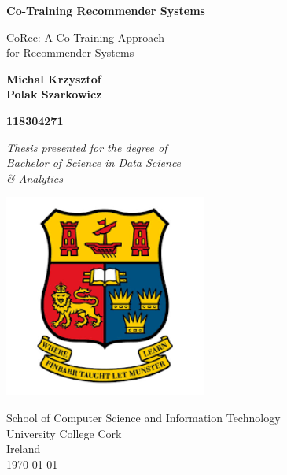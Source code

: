 \begin{titlepage}
    \begin{center}
        \vspace*{0.5cm}
        
        \Huge
        \textbf{Co-Training Recommender Systems}

        \vspace{0.5cm}
        
        \LARGE
        CoRec: A Co-Training Approach \\ for Recommender Systems
        
        \vspace{1cm}
        
        \textbf{Michal Krzysztof \\ Polak Szarkowicz}
        
        \vspace{0.3cm}
        
        \textbf{118304271}
        
        \vspace{2cm}
        
        \textit{Thesis presented for the degree of\\
        Bachelor of Science in Data Science\\
        \& Analytics}
        
        \vspace{0.5cm}
        
        \includegraphics[width=0.5\textwidth]{images/ucc_logo.png}
        
        \large
        School of Computer Science and Information Technology\\
        University College Cork\\
        Ireland\\
        \today
        
        
        \vspace{1cm}
        
    \end{center}
\end{titlepage}

